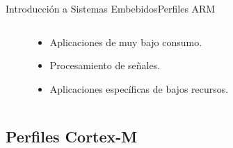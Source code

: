 \documentclass[aspectratio=169, xcolor=dvipsnames]{beamer}
\begin{document}
\begin{frame}{Introducción a Sistemas Embebidos}{Perfiles ARM}
\begin{figure}
\begin{columns}
\begin{column}{0.5\textwidth}
\begin{itemize}
                \begin{itemize}
                    \item Aplicaciones de muy bajo consumo.
                    \item Procesamiento de señales.
                    \item Aplicaciones específicas de bajos recursos.
                \end{itemize}
        \end{itemize}
    \end{column}
\end{columns}    
\end{figure}
\end{frame}

\subsection{Perfiles Cortex-M}
\end{document}

